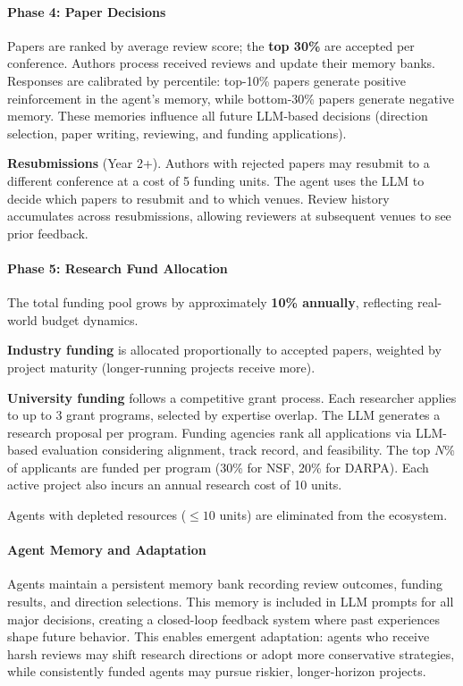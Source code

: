 \documentclass{article}
\begin{document}
\paragraph{Phase 4: Paper Decisions}

Papers are ranked by average review score; the \textbf{top 30\%} are accepted per conference. Authors process received reviews and update their memory banks. Responses are calibrated by percentile: top-10\% papers generate positive reinforcement in the agent's memory, while bottom-30\% papers generate negative memory. These memories influence all future LLM-based decisions (direction selection, paper writing, reviewing, and funding applications).

\textbf{Resubmissions} (Year 2+). Authors with rejected papers may resubmit to a different conference at a cost of 5 funding units. The agent uses the LLM to decide which papers to resubmit and to which venues. Review history accumulates across resubmissions, allowing reviewers at subsequent venues to see prior feedback.


\paragraph{Phase 5: Research Fund Allocation}

The total funding pool grows by approximately \textbf{10\% annually}, reflecting real-world budget dynamics.

\noindent \textbf{Industry funding} is allocated proportionally to accepted papers, weighted by project maturity (longer-running projects receive more).

\noindent \textbf{University funding} follows a competitive grant process. Each researcher applies to up to 3 grant programs, selected by expertise overlap. The LLM generates a research proposal per program. Funding agencies rank all applications via LLM-based evaluation considering alignment, track record, and feasibility. The top $N$\% of applicants are funded per program (30\% for NSF, 20\% for DARPA). Each active project also incurs an annual research cost of 10 units.

\noindent Agents with depleted resources ($\leq 10$ units) are eliminated from the ecosystem.


\paragraph{Agent Memory and Adaptation}
Agents maintain a persistent memory bank recording review outcomes, funding results, and direction selections. This memory is included in LLM prompts for all major decisions, creating a closed-loop feedback system where past experiences shape future behavior. This enables emergent adaptation: agents who receive harsh reviews may shift research directions or adopt more conservative strategies, while consistently funded agents may pursue riskier, longer-horizon projects.
\end{document}
